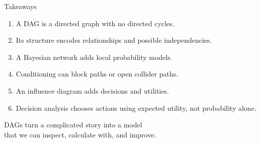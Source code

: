 \documentclass[aspectratio=43,11pt]{beamer}
\begin{document}
\begin{frame}{Takeaways}

\begin{enumerate}
  \item A DAG is a directed graph with no directed cycles.
  \item Its structure encodes relationships and possible independencies.
  \item A Bayesian network adds local probability models.
  \item Conditioning can block paths or open collider paths.
  \item An influence diagram adds decisions and utilities.
  \item Decision analysis chooses actions using expected utility, not
        probability alone.
\end{enumerate}

\bigskip

\begin{center}
DAGs turn a complicated story into a model\\
that we can inspect, calculate with, and improve.
\end{center}

\end{frame}

%
%
%
%

\end{document}
